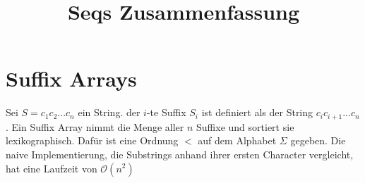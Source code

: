 \documentclass[a4paper, 12pt]{article}
\theoremstyle{plain}
\theoremstyle{definition}
\theoremstyle{lemma}
\theoremstyle{remark}
\theoremstyle{corollary}
\theoremstyle{example}
\begin{document}
	\begin{titlepage} 
		\title{Seqs Zusammenfassung}
		\clearpage\maketitle
		\thispagestyle{empty}
	\end{titlepage}
	\tableofcontents
	\newpage
	\section{Suffix Arrays}
	Sei $S = c_1c_2...c_n$ ein String. der $i$-te Suffix $S_i$ ist definiert als der String $c_ic_{i+1}...c_n$. Ein Suffix Array nimmt die Menge aller $n$ Suffixe und sortiert sie lexikographisch. Dafür ist eine Ordnung $<$ auf dem Alphabet $\Sigma$ gegeben. Die naive Implementierung, die Substrings anhand ihrer ersten Character vergleicht, hat eine Laufzeit von $\mathcal{O}(n^2)$
\end{document}
